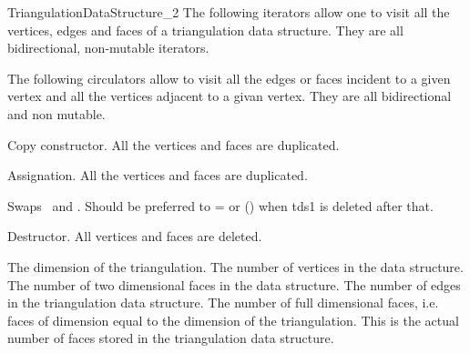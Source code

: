 \begin{ccRefConcept}{TriangulationDataStructure_2}
The following iterators allow one to visit all the vertices, edges
and  faces
of a triangulation data structure. They are all
bidirectional, non-mutable iterators.
\ccGlue
{}
\ccGlue
{}


The following circulators allow to visit all the edges or faces
incident to a given vertex and all the vertices
adjacent to a givan vertex.  They are all bidirectional and non mutable.
\ccGlue
{}
\ccGlue
{}
 




\ccCreation
{}  %


{Copy constructor. All the vertices and faces are duplicated.}

{Assignation. All the vertices and faces are duplicated.}

{Swaps \ccVar\ and . Should be preferred to \ccVar= or \ccVar()
when tds1 is deleted after that.}

\ccModifierCrossRefOff
{}
{Destructor. All vertices and faces are deleted.}
\ccModifierCrossRefOff

\ccAccessFunctions
{}
{The dimension of the triangulation.}
\ccGlue
{}
{The number of vertices in the data structure.}
\ccGlue
{}
{The number of two dimensional faces in the data structure.}
\ccGlue
{}
{The number of edges  in the triangulation data structure.}
\ccGlue
{}
{The number of full dimensional faces, 
i.e. faces of dimension equal to the dimension
of the triangulation. This is the actual
number of faces stored in the triangulation data structure.}

\begin{ccAdvanced}
\ccGlue
{}
\end{ccAdvanced}


\end{ccRefConcept}
